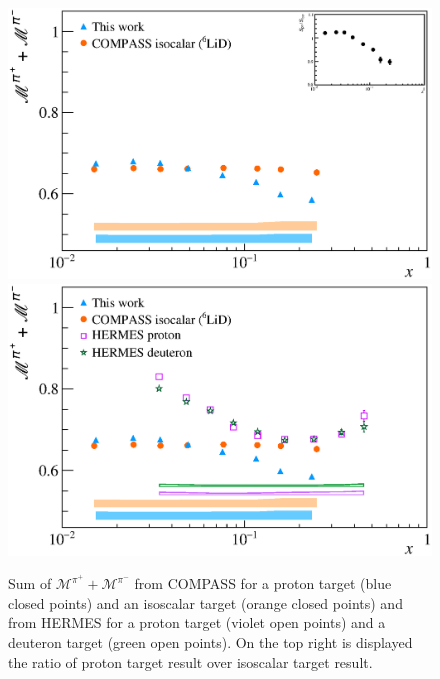 \begin{figure}[!h]
  \centering
	\includegraphics[scale=0.5]{./gfx/Mult_pi_sum_noH.eps}
  \includegraphics[scale=0.5]{./gfx/Mult_pi_sum.eps}
  \caption{Sum of $\mathscr{M}^{\pi^+}+\mathscr{M}^{\pi^-}$ from COMPASS for a proton target (blue closed points) and an isoscalar target (orange closed points) and from HERMES for a proton target (violet open points) and a deuteron target (green open points). On the top right is displayed the ratio of proton target result over isoscalar target result.}
  \label{pic:pisum}
\end{figure}

\newpage

